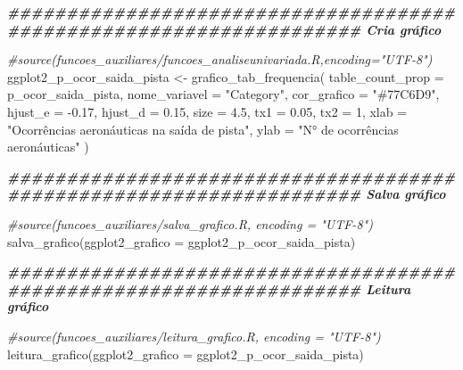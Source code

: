 \documentclass[
]{article}
\newenvironment{Shaded}{\begin{snugshade}}{\end{snugshade}}
\newcommand{\AttributeTok}[1]{\textcolor[rgb]{0.77,0.63,0.00}{#1}}
\newcommand{\CommentTok}[1]{\textcolor[rgb]{0.56,0.35,0.01}{\textit{#1}}}
\newcommand{\DecValTok}[1]{\textcolor[rgb]{0.00,0.00,0.81}{#1}}
\newcommand{\DocumentationTok}[1]{\textcolor[rgb]{0.56,0.35,0.01}{\textbf{\textit{#1}}}}
\newcommand{\FloatTok}[1]{\textcolor[rgb]{0.00,0.00,0.81}{#1}}
\newcommand{\FunctionTok}[1]{\textcolor[rgb]{0.00,0.00,0.00}{#1}}
\newcommand{\NormalTok}[1]{#1}
\newcommand{\OtherTok}[1]{\textcolor[rgb]{0.56,0.35,0.01}{#1}}
\newcommand{\SpecialCharTok}[1]{\textcolor[rgb]{0.00,0.00,0.00}{#1}}
\newcommand{\StringTok}[1]{\textcolor[rgb]{0.31,0.60,0.02}{#1}}
\begin{document}
\begin{Shaded}
\begin{Highlighting}[]
\DocumentationTok{\#\#\#\#\#\#\#\#\#\#\#\#\#\#\#\#\#\#\#\#\#\#\#\#\#\#\#\#\#\#\#\#\#\#\#\#\#\#\#\#\#\#\#\#\#\#\#\#\#\#\#\#\#\#\#\#\#\#\#\#\#\#\#\#\#\#\#\# Cria gráfico}

\CommentTok{\#source(\textquotesingle{}funcoes\_auxiliares/funcoes\_analiseunivariada.R\textquotesingle{},encoding="UTF{-}8")}
\NormalTok{ggplot2\_p\_ocor\_saida\_pista }\OtherTok{\textless{}{-}} \FunctionTok{grafico\_tab\_frequencia}\NormalTok{(}
    \AttributeTok{table\_count\_prop =}\NormalTok{ p\_ocor\_saida\_pista,}
    \AttributeTok{nome\_variavel =} \StringTok{"Category"}\NormalTok{,}
    \AttributeTok{cor\_grafico =} \StringTok{"\#77C6D9"}\NormalTok{,}
    \AttributeTok{hjust\_e =} \SpecialCharTok{{-}}\FloatTok{0.17}\NormalTok{,}
    \AttributeTok{hjust\_d =} \FloatTok{0.15}\NormalTok{,}
    \AttributeTok{size =} \FloatTok{4.5}\NormalTok{,}
    \AttributeTok{tx1 =} \FloatTok{0.05}\NormalTok{,}
    \AttributeTok{tx2 =} \DecValTok{1}\NormalTok{,}
    \AttributeTok{xlab =} \StringTok{"Ocorrências aeronáuticas na saída de pista"}\NormalTok{,}
    \AttributeTok{ylab =} \StringTok{"N° de ocorrências aeronáuticas"}
\NormalTok{)}

\DocumentationTok{\#\#\#\#\#\#\#\#\#\#\#\#\#\#\#\#\#\#\#\#\#\#\#\#\#\#\#\#\#\#\#\#\#\#\#\#\#\#\#\#\#\#\#\#\#\#\#\#\#\#\#\#\#\#\#\#\#\#\#\#\#\#\#\#\#\#\#\# Salva gráfico}

\CommentTok{\#source(\textquotesingle{}funcoes\_auxiliares/salva\_grafico.R\textquotesingle{}, encoding = "UTF{-}8")}
\FunctionTok{salva\_grafico}\NormalTok{(}\AttributeTok{ggplot2\_grafico =}\NormalTok{ ggplot2\_p\_ocor\_saida\_pista)}

\DocumentationTok{\#\#\#\#\#\#\#\#\#\#\#\#\#\#\#\#\#\#\#\#\#\#\#\#\#\#\#\#\#\#\#\#\#\#\#\#\#\#\#\#\#\#\#\#\#\#\#\#\#\#\#\#\#\#\#\#\#\#\#\#\#\#\#\#\#\#\#\# Leitura gráfico}

\CommentTok{\#source(\textquotesingle{}funcoes\_auxiliares/leitura\_grafico.R\textquotesingle{}, encoding = "UTF{-}8")}
\FunctionTok{leitura\_grafico}\NormalTok{(}\AttributeTok{ggplot2\_grafico =}\NormalTok{ ggplot2\_p\_ocor\_saida\_pista)}
\end{Highlighting}
\end{Shaded}
\end{document}
